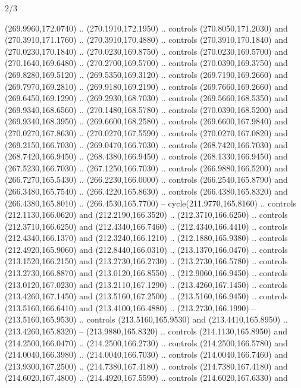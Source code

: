 \begin{flagdescription}{2/3}
\begin{scope}[xshift=0.5\flaglength,yshift=0.5\flagwidth,scale=\flagwidth/259.2]
\begin{scope}[y=0.8pt, x=0.8pt, yscale=-1,shift={(-243,-162)}]
      (269.9960,172.0740) .. (270.1910,172.1950) .. controls (270.8050,171.2030) and
      (270.3910,171.1760) .. (270.3910,170.4880) .. controls (270.3910,170.1840) and
      (270.0230,170.1840) .. (270.0230,169.8750) .. controls (270.0230,169.5700) and
      (270.1640,169.6480) .. (270.2700,169.5700) .. controls (270.0390,169.3750) and
      (269.8280,169.5120) .. (269.5350,169.3120) .. controls (269.7190,169.2660) and
      (269.7970,169.2810) .. (269.9180,169.2190) .. controls (269.7660,169.2660) and
      (269.6450,169.1290) .. (269.2930,168.7030) .. controls (269.5660,168.5350) and
      (269.9340,168.6560) .. (270.1480,168.5780) .. controls (270.0390,168.5200) and
      (269.9340,168.3950) .. (269.6600,168.2580) .. controls (269.6600,167.9840) and
      (270.0270,167.8630) .. (270.0270,167.5590) .. controls (270.0270,167.0820) and
      (269.2150,166.7030) .. (269.0470,166.7030) .. controls (268.7420,166.7030) and
      (268.7420,166.9450) .. (268.4380,166.9450) .. controls (268.1330,166.9450) and
      (267.5230,166.7030) .. (267.1250,166.7030) .. controls (266.9880,166.5200) and
      (266.7270,165.5430) .. (266.2230,166.0000) .. controls (266.2540,165.8790) and
      (266.3480,165.7540) .. (266.4220,165.8630) .. controls (266.4380,165.8320) and
      (266.4380,165.8010) .. (266.4530,165.7700) -- cycle(211.9770,165.8160) ..
      controls (212.1130,166.0620) and (212.2190,166.3520) .. (212.3710,166.6250) ..
      controls (212.3710,166.6250) and (212.4340,166.7460) .. (212.4340,166.4410) ..
      controls (212.4340,166.1370) and (212.3240,166.1210) .. (212.1880,165.9380) ..
      controls (212.4920,165.9060) and (212.8440,166.0310) .. (213.1370,166.0470) ..
      controls (213.1520,166.2150) and (213.2730,166.2730) .. (213.2730,166.5780) ..
      controls (213.2730,166.8870) and (213.0120,166.8550) .. (212.9060,166.9450) ..
      controls (213.0120,167.0230) and (213.2110,167.1290) .. (213.4260,167.1450) ..
      controls (213.4260,167.1450) and (213.5160,167.2500) .. (213.5160,166.9450) ..
      controls (213.5160,166.6410) and (213.4100,166.4880) .. (213.2730,166.1990) --
      (213.5160,165.9530) .. controls (213.5160,165.9530) and (213.4410,165.8950) ..
      (213.4260,165.8320) -- (213.9880,165.8320) .. controls (214.1130,165.8950) and
      (214.2500,166.0470) .. (214.2500,166.2730) .. controls (214.2500,166.5780) and
      (214.0040,166.3980) .. (214.0040,166.7030) .. controls (214.0040,166.7460) and
      (213.9300,167.2500) .. (214.7380,167.4180) .. controls (214.7380,167.4180) and
      (214.6020,167.4800) .. (214.4920,167.5590) .. controls (214.6020,167.6330) and

\end{scope}
\end{scope}
\end{flagdescription}

